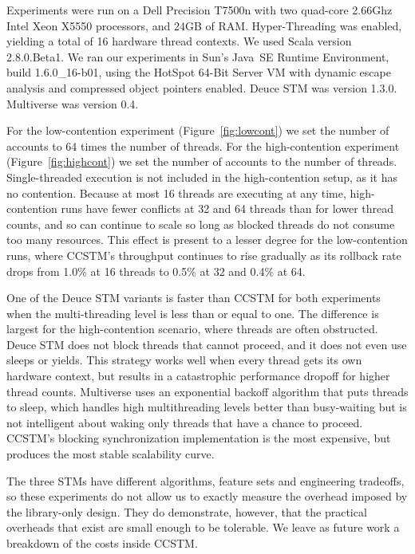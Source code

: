 Experiments were run on a Dell Precision T7500n with two quad-core
2.66Ghz Intel Xeon X5550 processors, and 24GB of RAM.  Hyper-Threading was
enabled, yielding a total of 16 hardware thread contexts.  We used Scala
version 2.8.0.Beta1.  We ran our experiments in
Sun's Java~SE Runtime Environment, build 1.6.0\_16-b01, using the HotSpot
64-Bit Server VM with dynamic escape analysis and compressed object pointers
enabled.  Deuce STM was version 1.3.0.  Multiverse was version 0.4.

For the low-contention
experiment (Figure~\ref{fig:lowcont}) we set the number of accounts
to 64 times the number of threads.  For the high-contention experiment
(Figure~\ref{fig:highcont}) we set the number of accounts to the number of
threads.  Single-threaded execution is not included in the high-contention
setup, as it has no contention.  Because at most 16 threads are executing
at any time, high-contention runs have fewer conflicts at 32 and 64
threads than for lower thread counts, and so can continue to scale so long as
blocked threads do not consume too many resources.  This effect is present
to a lesser degree for the low-contention runs, where CCSTM's throughput
continues to rise gradually as its rollback rate
drops from 1.0\% at 16 threads to 0.5\% at 32 and 0.4\% at 64.

One of the Deuce STM variants is faster than CCSTM for both experiments
when the multi-threading level is less than or equal to one.  The
difference is largest for the high-contention scenario, where threads
are often obstructed.  Deuce STM does not block threads that cannot
proceed, and it does not even use sleeps or yields.  This strategy works
well when every thread gets its own hardware context, but results in a
catastrophic performance dropoff for higher thread counts.  Multiverse
uses an exponential backoff algorithm that puts threads to sleep, which
handles high multithreading levels better than busy-waiting but is not
intelligent about waking only threads that have a chance to proceed.
CCSTM's blocking synchronization implementation is the most expensive,
but produces the most stable scalability curve.

The three STMs have different algorithms, feature sets and engineering
tradeoffs, so these experiments do not allow us to exactly measure
the overhead imposed by the library-only design.  They do demonstrate,
however, that the practical overheads that exist are small enough to be
tolerable.  We leave as future work a breakdown of the costs inside CCSTM.

